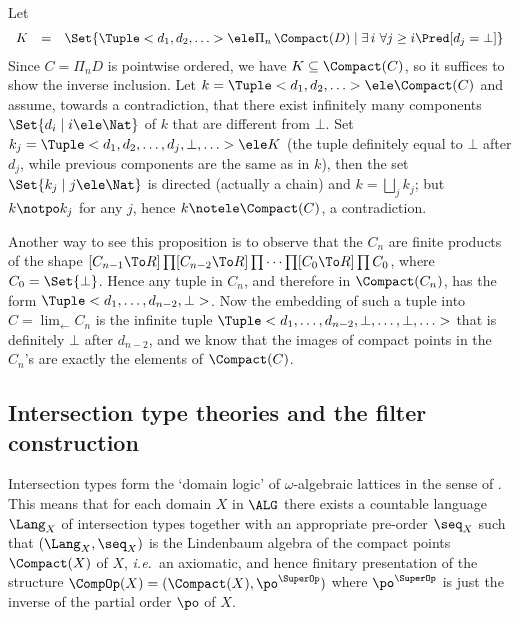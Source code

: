\documentclass{lmcs}
\def\ie{\emph{i.e.}}
\begin{document}
 \begin{Proof}
Let 
%
 \[ \begin{array}{rcl}
K &=& \Set{\Tuple <d_1, d_2, \ldots > \ele \Pi_n \, \Compact(D) \mid \exists \,i \ \forall j\geq i \Pred[ d_j = \bot ] }
 \end{array} \]
Since $C = \Pi_n D$ is pointwise ordered, we have %
$K \subseteq \Compact(C)$, so %
it suffices to show the inverse inclusion.
%
Let $k = \Tuple <d_1, d_2, \ldots > \ele \Compact(C)$ and assume, towards a contradiction, that there exist infinitely many components $\Set{d_i \mid i \ele \Nat}$ of $k$ that are different from $\bot$. 
Set $k_j = \Tuple <d_1, d_2, \ldots, d_{j}, \bot, \ldots > \ele K$ (the tuple definitely equal to $\bot$ after $d_j$, while previous components are the same as in $k$), then the set $\Set{k_j \mid j\ele \Nat}$ is directed (actually a chain) and $k = \bigsqcup_j k_j$; but $k \notpo k_j$ for any $j$, hence $k\notele \Compact(C)$, a contradiction. 
 \end{Proof}

Another way to see this proposition is to observe that the $C_n$ are finite products of the shape $[C_{n-1} \To R]\prod [C_{n-2} \To R]\prod \cdots\prod [C_0\To R]\prod C_0$, where $C_0 = \Set{\bot}$.
Hence any tuple in $C_n$, and therefore in $\Compact(C_n)$, has the form $\Tuple <d_1,\ldots,d_{n-2},\bot>$. 
Now the embedding of such a tuple into $C = \lim_{\leftarrow} C_n$ is the infinite tuple
$\Tuple <d_1,\ldots,d_{n-2},\bot,\ldots,\bot,\ldots>$ that is definitely $\bot$ after $d_{n-2}$, and we know that the images of compact points in the $C_n$'s are exactly the elements of $\Compact(C)$.



 \subsection{Intersection type theories and the filter construction} \label{w-algebraic-lattices}

Intersection types form the `domain logic' of $\omega$-algebraic lattices in the sense of \cite{Abramsky'91}. 
This means that for each domain $X$ in $\ALG$ there exists a countable language $\Lang_X$ of intersection types together with an appropriate pre-order $\seq_X$ such that $(\Lang_X,\seq_X)$ is the Lindenbaum algebra of the compact points $\Compact(X)$ of $X$, 
\ie~an axiomatic, and hence finitary presentation of the structure $\CompOp(X) = (\Compact(X), \po^{\SuperOp})$ where $\po^{\SuperOp}$ is just the inverse of the partial order $\po$ of $X$.
\end{document}

